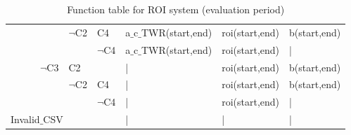 \documentclass[runningheads,12pt]{article}
\begin{document}
\begin{landscape}
\begin{table}
\begin{tabular}{|l|l|l|l|l|l||l|l|l|}
\cline{5-9}
& & & & $\lnot$C2 & C4 & a$\_$c$\_$TWR(start,end) & roi(start,end) & b(start,end)\\

\cline{6-9}
& & & & & $\lnot$C4 & a$\_$c$\_$TWR(start,end) & roi(start,end) & |\\

\cline{4-9}
& & & $\lnot$C3 &\multicolumn{2}{|l||}{C2} & | & roi(start,end) & b(start,end)\\

\cline{5-9}
& & & & $\lnot$C2 & C4 & | & roi(start,end) & b(start,end)\\

\cline{6-9}
& & & & & $\lnot$C4 & | & roi(start,end) & |\\


\hline
\multicolumn{6}{|l||}{Invalid$\_$CSV} & | & | & |\\ 


\hline
\end{tabular}




\caption{Function table for ROI system (evaluation period)}
\label{table:table_ROI_2}
\end{table}
\end{landscape}
\end{document}
